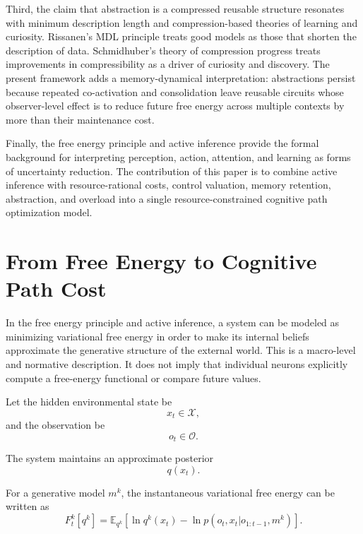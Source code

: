\documentclass[11pt, a4paper]{article}
\begin{document}
Third, the claim that abstraction is a compressed reusable structure resonates with minimum description length and compression-based theories of learning and curiosity. Rissanen's MDL principle treats good models as those that shorten the description of data. Schmidhuber's theory of compression progress treats improvements in compressibility as a driver of curiosity and discovery. The present framework adds a memory-dynamical interpretation: abstractions persist because repeated co-activation and consolidation leave reusable circuits whose observer-level effect is to reduce future free energy across multiple contexts by more than their maintenance cost.

Finally, the free energy principle and active inference provide the formal background for interpreting perception, action, attention, and learning as forms of uncertainty reduction. The contribution of this paper is to combine active inference with resource-rational costs, control valuation, memory retention, abstraction, and overload into a single resource-constrained cognitive path optimization model.

\section{From Free Energy to Cognitive Path Cost}

In the free energy principle and active inference, a system can be modeled as minimizing variational free energy in order to make its internal beliefs approximate the generative structure of the external world. This is a macro-level and normative description. It does not imply that individual neurons explicitly compute a free-energy functional or compare future values.

Let the hidden environmental state be
\begin{equation}
    x_t \in \mathcal{X},
\end{equation}
and the observation be
\begin{equation}
    o_t \in \mathcal{O}.
\end{equation}

The system maintains an approximate posterior
\begin{equation}
    q(x_t).
\end{equation}

For a generative model $m^k$, the instantaneous variational free energy can be written as
\begin{equation}
F_t^k[q^k]
=
\mathbb{E}_{q^k}
\left[
\ln q^k(x_t)
-
\ln p(o_t,x_t|o_{1:t-1},m^k)
\right].
\end{equation}
\end{document}
